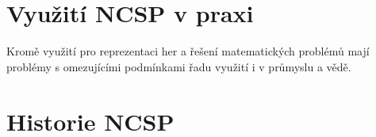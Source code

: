\section{Využití NCSP v praxi}

Kromě využití pro reprezentaci her a řešení matematických problémů mají problémy s omezujícími podmínkami řadu využití i v průmyslu a vědě.




\section{Historie NCSP}
